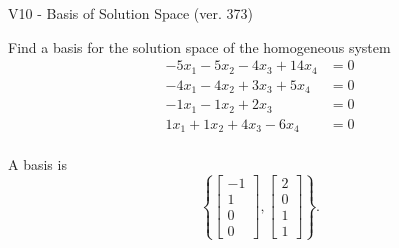 \begin{exercise}
  \begin{exerciseTitle}V10 - Basis of Solution Space (ver. 373)\end{exerciseTitle}
  \begin{exerciseStatement}
    Find a basis for the solution space of the homogeneous system 
\begin{align*}
 -5 x_ 1 -5 x_ 2 -4 x_ 3 + 14 x_ 4 &= 0  \\ 
  -4 x_ 1 -4 x_ 2 + 3 x_ 3 + 5 x_ 4 &= 0  \\ 
  -1 x_ 1 -1 x_ 2 + 2 x_ 3 &= 0  \\ 
  1 x_ 1 + 1 x_ 2 + 4 x_ 3 -6 x_ 4 &= 0  \\ 
 \end{align*}


 
  \end{exerciseStatement}

  \begin{exerciseAnswer}
   A basis is   
\[\left\{\left[\begin{array}{c}
-1 \\
1 \\
0 \\
0
\end{array}\right] , \left[\begin{array}{c}
2 \\
0 \\
1 \\
1
\end{array}\right]\right\}.\]

  


  \end{exerciseAnswer}
\end{exercise}